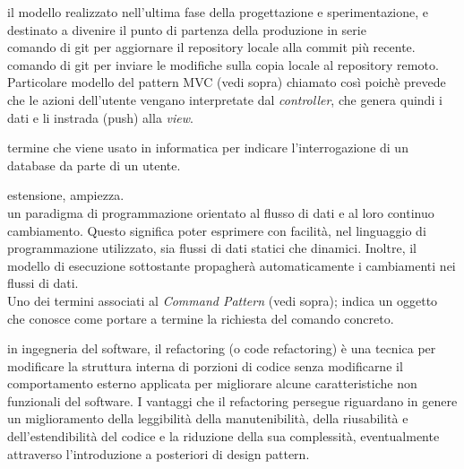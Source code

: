 \documentclass{scalatekids-article}
\begin{document}
   il modello realizzato nell’ultima fase della progettazione e sperimentazione, e destinato a divenire il punto di partenza della produzione in serie
  \\

   comando di git per aggiornare il repository locale alla commit più recente.
  \\

   comando di git per inviare le modifiche sulla copia locale al repository remoto.
  \\

   Particolare modello del pattern MVC (vedi sopra) chiamato così poichè prevede che le azioni dell'utente vengano interpretate dal \textit{controller}, che genera quindi i dati e li instrada (push) alla \textit{view}.
  \\


   termine che viene usato in informatica per indicare l'interrogazione di un database da parte di un utente.
  \\


   estensione, ampiezza.
  \\

   un paradigma di programmazione orientato al flusso di dati e al loro continuo cambiamento.
  Questo significa poter esprimere con facilità, nel linguaggio di programmazione utilizzato, sia flussi di dati statici che dinamici.
  Inoltre, il modello di esecuzione sottostante propagherà automaticamente i cambiamenti nei flussi di dati.
  \\

   Uno dei termini associati al \textit{Command Pattern} (vedi sopra); indica un oggetto che conosce come portare a termine la richiesta del comando concreto.

   in ingegneria del software, il refactoring (o code refactoring) è una tecnica per modificare la struttura interna di porzioni di codice senza modificarne il comportamento esterno applicata per migliorare alcune caratteristiche non funzionali del software.
  I vantaggi che il refactoring persegue riguardano in genere un miglioramento della leggibilità della manutenibilità, della riusabilità e dell'estendibilità del codice e la riduzione della sua complessità, eventualmente attraverso l'introduzione a posteriori di design pattern.
  \\
  
\end{document}
